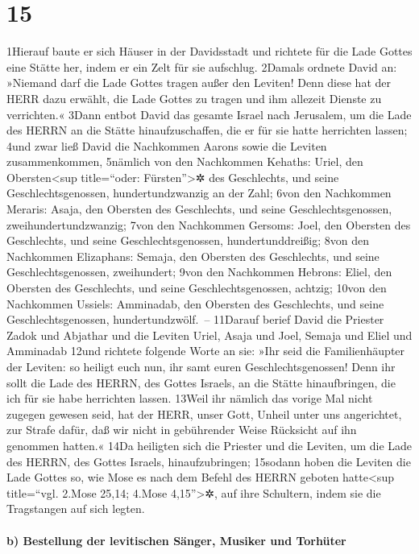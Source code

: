 \hypertarget{section-14}{%
\section{15}\label{section-14}}

1Hierauf baute er sich Häuser in der Davidsstadt und richtete für die
Lade Gottes eine Stätte her, indem er ein Zelt für sie aufschlug.
2Damals ordnete David an: »Niemand darf die Lade Gottes tragen außer den
Leviten! Denn diese hat der HERR dazu erwählt, die Lade Gottes zu tragen
und ihm allezeit Dienste zu verrichten.« 3Dann entbot David das gesamte
Israel nach Jerusalem, um die Lade des HERRN an die Stätte
hinaufzuschaffen, die er für sie hatte herrichten lassen; 4und zwar ließ
David die Nachkommen Aarons sowie die Leviten zusammenkommen, 5nämlich
von den Nachkommen Kehaths: Uriel, den Obersten\textless sup
title=``oder: Fürsten''\textgreater✲ des Geschlechts, und seine
Geschlechtsgenossen, hundertundzwanzig an der Zahl; 6von den Nachkommen
Meraris: Asaja, den Obersten des Geschlechts, und seine
Geschlechtsgenossen, zweihundertundzwanzig; 7von den Nachkommen Gersoms:
Joel, den Obersten des Geschlechts, und seine Geschlechtsgenossen,
hundertunddreißig; 8von den Nachkommen Elizaphans: Semaja, den Obersten
des Geschlechts, und seine Geschlechtsgenossen, zweihundert; 9von den
Nachkommen Hebrons: Eliel, den Obersten des Geschlechts, und seine
Geschlechtsgenossen, achtzig; 10von den Nachkommen Ussiels: Amminadab,
den Obersten des Geschlechts, und seine Geschlechtsgenossen,
hundertundzwölf.~-- 11Darauf berief David die Priester Zadok und
Abjathar und die Leviten Uriel, Asaja und Joel, Semaja und Eliel und
Amminadab 12und richtete folgende Worte an sie: »Ihr seid die
Familienhäupter der Leviten: so heiligt euch nun, ihr samt euren
Geschlechtsgenossen! Denn ihr sollt die Lade des HERRN, des Gottes
Israels, an die Stätte hinaufbringen, die ich für sie habe herrichten
lassen. 13Weil ihr nämlich das vorige Mal nicht zugegen gewesen seid,
hat der HERR, unser Gott, Unheil unter uns angerichtet, zur Strafe
dafür, daß wir nicht in gebührender Weise Rücksicht auf ihn genommen
hatten.« 14Da heiligten sich die Priester und die Leviten, um die Lade
des HERRN, des Gottes Israels, hinaufzubringen; 15sodann hoben die
Leviten die Lade Gottes so, wie Mose es nach dem Befehl des HERRN
geboten hatte\textless sup title=``vgl. 2.Mose 25,14; 4.Mose
4,15''\textgreater✲, auf ihre Schultern, indem sie die Tragstangen auf
sich legten.

\hypertarget{b-bestellung-der-levitischen-suxe4nger-musiker-und-torhuxfcter}{%
\paragraph{b) Bestellung der levitischen Sänger, Musiker und
Torhüter}\label{b-bestellung-der-levitischen-suxe4nger-musiker-und-torhuxfcter}}

